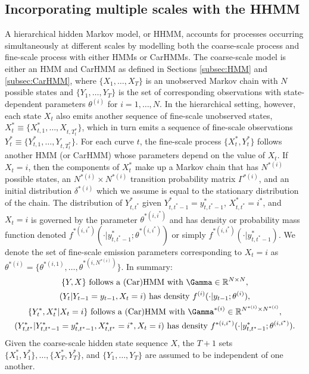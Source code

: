 \subsection{Incorporating multiple scales with the HHMM}
\label{subsec:HHMM}

A hierarchical hidden Markov model, or HHMM, accounts for processes occurring simultaneously at different scales by modelling both the coarse-scale process and fine-scale process with either HMMs \citep{Barajas:2017,Adam:2019} or CarHMMs. The coarse-scale model is either an HMM and CarHMM as defined in Sections \ref{subsec:HMM} and \ref{subsec:CarHMM}, where $\{X_1, \ldots, X_T\}$ is an unobserved Markov chain with $N$ possible states and $\{Y_1, \ldots, Y_T\}$ is the set of corresponding observations with state-dependent parameters $\theta^{(i)}$ for $i = 1,\ldots,N$.   
%
In the hierarchical setting, however, each state $X_t$ also emits another sequence of fine-scale unobserved states, $X_t^* \equiv \{X_{t,1}^*,\ldots, X_{t,T_t^*}\}$, which in turn emits a sequence of fine-scale observations $Y_t^* \equiv \{Y_{t,1}^*,\ldots, Y_{t,T_t^*}\}$. For each curve $t$, the fine-scale process $\{X_t^*, Y_t^*\}$ follows another HMM (or CarHMM) whose parameters depend on the value of $X_t$. If $X_t = i$, then the components of $X_t^*$ make up a Markov chain that has $N^{*(i)}$ possible states, an $N^{*(i)} \times N^{*(i)}$ transition probability matrix $\Gamma^{*(i)}$, and an initial distribution $\delta^{*(i)}$ which we assume is equal to the stationary distribution of the chain. The distribution of $Y^*_{t,t^*}$ given $Y^*_{t,t^*-1} = y^*_{t,t^*-1}$, $X^*_{t,t^*}=i^*$, and $X_t=i$ is governed by the parameter $\theta^{*(i,i^*)}$ and has density or probability mass function denoted $f^{*(i,i^*)}\left(\cdot|y^*_{t,t^*-1}; \theta^{*(i,i^*)}\right)$ or simply $f^{*(i,i^*)}(\cdot|y^*_{t,t^*-1})$. We denote the set of fine-scale emission parameters corresponding to $X_t=i$ as $\theta^{*(i)}=\big\{\theta^{*(i,1)}, \ldots, \theta^{*\left(i,N^{*(i)}\right)}\big\}$. In summary:
%
%
\begin{gather*}
    \{Y, X\} \text{ follows a (Car)HMM with } \Gamma \in \bbR^{N \times N}, \\
    (Y_t | Y_{t-1} = y_{t-1}, X_t = i) \text{ has density } f^{(i)}(\cdot|y_{t-1};\theta^{(i)}), \\
    \{Y^*_t,X^*_t | X_t = i\} \text{ follows a (Car)HMM with } \Gamma^{*(i)} \in \bbR^{N^{*(i)} \times N^{*(i)}}, \\
    (Y^*_{t,t^*} | Y^*_{t,t^*-1} = y^*_{t,t^*-1}, X^*_{t,t^*} = i^*, X_t = i) \text{ has density } f^{*(i,i^*)}(\cdot|y^{*}_{t,t^*-1};\theta^{(i,i^*)}).
\end{gather*}
Given the coarse-scale hidden state sequence $X$, the $T+1$ sets $\{X_1^*, Y_1^*\}, \ldots, \{X_T^*, Y_T^*\}$, and $\{Y_1,\ldots,Y_T\}$ are assumed to be independent of one another.
%
%

